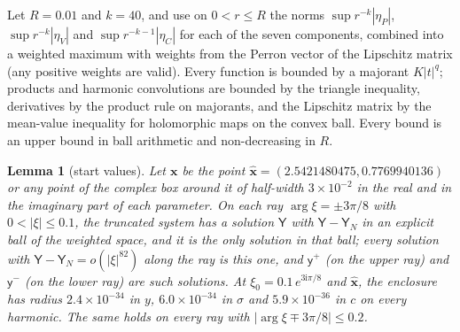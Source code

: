 \documentclass{amsart}
\numberwithin{equation}{section}
\theoremstyle{plain}
\newtheorem{lemma}[definition]{Lemma}
\theoremstyle{definition}
\theoremstyle{remark}
\newcommand{\bx}{\mathbf{x}}
\newcommand{\hx}{\hat{\mathbf{x}}}
\newcommand{\iu}{\mathrm{i}}
\begin{document}
Let $R = 0.01$ and $k = 40$, and use on $0 < r \le R$ the norms $\sup r^{-k}|\eta_P|$, $\sup r^{-k}|\eta_V|$ and
$\sup r^{-k-1}|\eta_C|$ for each of the seven components, combined into a weighted maximum with weights from the Perron vector
of the Lipschitz matrix (any positive weights are valid). Every function is bounded by a majorant $K|t|^q$; products and
harmonic convolutions are bounded by the triangle inequality, derivatives by the product rule on majorants, and the
Lipschitz matrix by the mean-value inequality for holomorphic maps on the convex ball. Every bound is an upper bound in
ball arithmetic and non-decreasing in $R$.

\begin{lemma}[start values]\label{lem:start}
Let $\bx$ be the point $\hx = (2.5421480475, 0.7769940136)$ or any point of the complex box around it of half-width
$3\times10^{-2}$ in the real and in the imaginary part of each parameter. On each ray $\arg\xi = \pm3\pi/8$ with
$0 < |\xi| \le 0.1$, the truncated system has a solution $\mathsf Y$ with $\mathsf Y - \mathsf Y_N$ in an explicit ball of the weighted
space, and it is the only solution in that ball; every solution with $\mathsf Y - \mathsf Y_N = o(|\xi|^{82})$ along the ray is this one,
and $\mathsf y^+$ (on the upper ray) and $\mathsf y^-$ (on the lower ray) are such solutions. At $\xi_0 = 0.1\,e^{3\iu\pi/8}$ and $\hx$,
the enclosure has radius $2.4\times10^{-34}$ in $y$, $6.0\times10^{-34}$ in $\sigma$ and $5.9\times10^{-36}$ in $c$ on every harmonic. The
same holds on every ray with $|\arg\xi \mp 3\pi/8| \le 0.2$.
\end{lemma}
\end{document}
